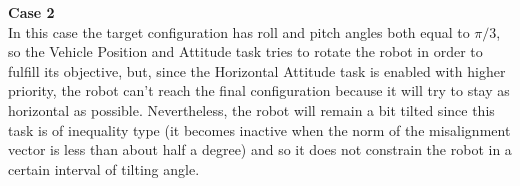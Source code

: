 \documentclass{article}
\begin{document}
{\large \textbf{Case 2}} \\
In this case the target configuration has roll and pitch angles both equal to $ \pi/3 $, so the Vehicle Position and Attitude task tries to rotate the robot in order to fulfill its objective, but, since the Horizontal Attitude task is enabled with higher priority, the robot can't reach the final configuration because it will try to stay as horizontal as possible. Nevertheless, the robot will remain a bit tilted since this task is of inequality type (it becomes inactive when the norm of the misalignment vector is less than about half a degree) and so it does not constrain the robot in a certain interval of tilting angle.

\begin{figure}[H]
	\centering
	\hspace{10mm}
	\label{fig:q2case2ab}
\end{figure}
\end{document}
